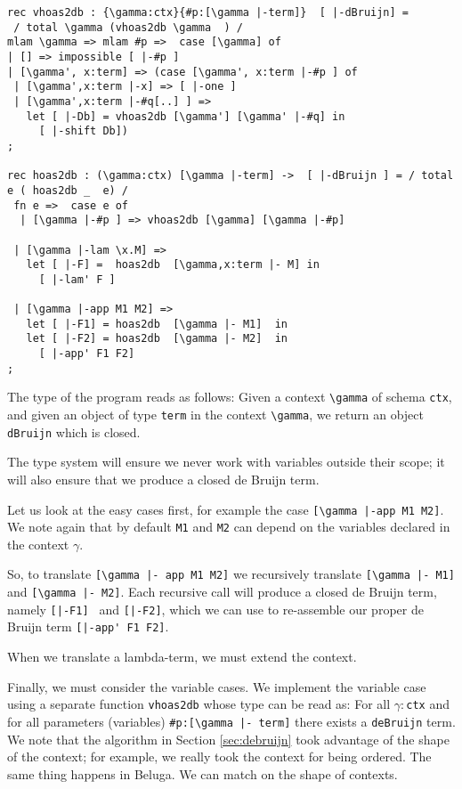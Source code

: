 \begin{lstlisting}
rec vhoas2db : {\gamma:ctx}{#p:[\gamma |-term]}  [ |-dBruijn] =
 / total \gamma (vhoas2db \gamma  ) /
mlam \gamma => mlam #p =>  case [\gamma] of
| [] => impossible [ |-#p ]
| [\gamma', x:term] => (case [\gamma', x:term |-#p ] of
 | [\gamma',x:term |-x] => [ |-one ]
 | [\gamma',x:term |-#q[..] ] =>
   let [ |-Db] = vhoas2db [\gamma'] [\gamma' |-#q] in
     [ |-shift Db])
;

rec hoas2db : (\gamma:ctx) [\gamma |-term] ->  [ |-dBruijn ] = / total e ( hoas2db _  e) /
 fn e =>  case e of
  | [\gamma |-#p ] => vhoas2db [\gamma] [\gamma |-#p]

 | [\gamma |-lam \x.M] =>
   let [ |-F] =  hoas2db  [\gamma,x:term |- M] in
     [ |-lam' F ]

 | [\gamma |-app M1 M2] =>
   let [ |-F1] = hoas2db  [\gamma |- M1]  in
   let [ |-F2] = hoas2db  [\gamma |- M2]  in
     [ |-app' F1 F2]
;
\end{lstlisting}

The type of the program reads as follows: Given a context
\lstinline!\gamma! of schema \lstinline!ctx!, and given an object of type
\lstinline!term! in the context \lstinline!\gamma!, we return an object
\lstinline!dBruijn! which is closed.

The type system will ensure we never work with variables outside their
scope; it will also ensure that we produce a closed de Bruijn term.

Let us look at the easy cases first, for example the case
\lstinline![\gamma |-app M1 M2]!.  We note again that by default \lstinline!M1! and \lstinline!M2! can depend on the variables declared in the context $\gamma$.

So, to translate \lstinline![\gamma |- app M1 M2]! we recursively
translate \lstinline![\gamma |- M1]! and \lstinline![\gamma |- M2]!. Each
recursive call will produce a closed de Bruijn term, namely
\lstinline![|-F1] ! and \lstinline![|-F2]!, which we can use to
re-assemble our proper de Bruijn term \lstinline![|-app' F1 F2]!.

When we translate a lambda-term, we must extend the context.


Finally, we must consider the variable cases. We implement the variable case using a separate function \lstinline!vhoas2db! whose type can be read as: For all $\gamma:$\lstinline!ctx! and for all parameters (variables) \lstinline!#p:[\gamma |- term]! there exists a \lstinline!deBruijn! term.  We note that the algorithm in Section \ref{sec:debruijn}
took advantage of the shape of the context; for
example, we really took the context for being ordered. The same thing
happens in Beluga. We can match on the shape of contexts.

